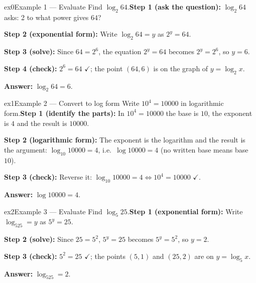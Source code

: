\documentclass[11pt]{article}
\begin{document}
\begin{example}{ex0}{Example 1 --- Evaluate}
Find $\log_2 64$.\soln \textbf{Step 1 (ask the question):} $\log_2 64$ asks: 2 to what power gives $64$?

\textbf{Step 2 (exponential form):} Write $\log_2 64=y$ as $2^y=64$.

\textbf{Step 3 (solve):} Since $64=2^6$, the equation $2^y=64$ becomes $2^y=2^6$, so $y=6$.

\textbf{Step 4 (check):} $2^6=64$ $\checkmark$; the point $(64,6)$ is on the graph of $y=\log_2x$.

\textbf{Answer:} $\log_2 64=6$.

\end{example}

\begin{example}{ex1}{Example 2 --- Convert to log form}
Write $10^4=10000$ in logarithmic form.\soln \textbf{Step 1 (identify the parts):} In $10^4=10000$ the base is $10$, the exponent is $4$ and the result is $10000$.

\textbf{Step 2 (logarithmic form):} The exponent is the logarithm and the result is the argument: $\log_{10}10000=4$, i.e.\ $\log10000=4$ (no written base means base $10$).

\textbf{Step 3 (check):} Reverse it: $\log_{10}10000=4\iff10^4=10000$ $\checkmark$.

\textbf{Answer:} $\log10000=4$.
\end{example}

\begin{example}{ex2}{Example 3 --- Evaluate}
Find $\log_5 25$.\soln \textbf{Step 1 (exponential form):} Write $\log_525=y$ as $5^y=25$.

\textbf{Step 2 (solve):} Since $25=5^2$, $5^y=25$ becomes $5^y=5^2$, so $y=2$.

\textbf{Step 3 (check):} $5^2=25$ $\checkmark$; the points $(5,1)$ and $(25,2)$ are on $y=\log_5x$.

\textbf{Answer:} $\log_525=2$.

\end{example}
\end{document}
